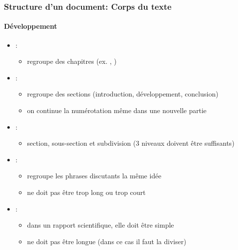 \documentclass[xcolor=table]{beamer}
\begin{document}
\begin{frame}
\frametitle{Structure d'un document: Corps du texte}
\framesubtitle{Développement}

\begin{itemize}
	\item {}: 
	\begin{itemize}
		\item regroupe des chapitres (ex. , ) 
	\end{itemize}

	\item {}:
	\begin{itemize}
		\item regroupe des sections (introduction, développement, conclusion)
		\item on continue la numérotation même dans une nouvelle partie
	\end{itemize}

	\item {}: 
	\begin{itemize}
		\item section, sous-section et subdivision (3 niveaux doivent être suffisants)
	\end{itemize}

	\item {}: 
	\begin{itemize}
		\item regroupe les phrases discutants la même idée
		\item ne doit pas être trop long ou trop court
	\end{itemize}

	\item {}:
	\begin{itemize}
		\item dans un rapport scientifique, elle doit être simple
		\item ne doit pas être longue (dans ce cas il faut la diviser)
	\end{itemize}
\end{itemize}

\end{frame}
\end{document}
